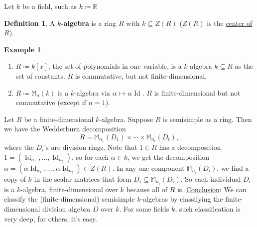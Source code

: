 \documentclass[12pt]{article}
\newcommand{\real}{\mathbb{R}}
\theoremstyle{definition}
\newtheorem{definition}[theorem]{Definition}
\newtheorem{example}{Example}[section]
\DeclareMathOperator\Id{Id}
\newcommand{\m}{\mathbb{M}}
\begin{document}
Let $k$ be a field, such as $k\coloneqq \real$
\begin{definition}
    A \textbf{$k$-algebra} is a ring $R$ with $k \subseteq Z(R)$ ($Z(R)$ is the \underline{center of $R$}). 
\end{definition}
\begin{example}
    \noindent
    \begin{enumerate}
        \item $R \coloneqq  k[x]$, the set of polynomials in one variable, is a $k$-algebra $k \subseteq R$ as the set of constants. $R$ is commutative, but not finite-dimensional.
        \item $R \coloneqq  \m_n(k)$ is a $k$-algebra via $\alpha \mapsto \alpha \Id$. $R$ is finite-dimensional but not commutative (except if $n = 1$).
    \end{enumerate}
\end{example}
Let $R$ be a finite-dimensional $k$-algebra. Suppose $R$ is semisimple as a ring. Then we have the Wedderburn decomposition
\begin{equation}
    R = \m_{n_1}(D_1) \times \dotsb \times \m_{n_t}(D_t),
\end{equation}
where the $D_i$'s are division rings. Note that $1 \in R$ has a decomposition $1 = (\Id_{n_1} , \dotsc , \Id_{n_t})$, so for each $\alpha \in k$, we get the decomposition
$\alpha = (\alpha \Id_{n_1} , \dotsc , \alpha \Id_{n_t}) \in Z(R)$. In any one component $\m_{n_i}(D_i)$, we find a copy of $k$ in the scalar matrices that form $D_i \subseteq \m_{n_i}(D_i)$. So each individual $D_i$ is a $k$-algebra, finite-dimensional over $k$ because all of $R$ is.
\newline
\newline 
\underline{Conclusion}: We can classify the (finite-dimensional) semisimple $k$-algebras by classifying the finite-dimensional division algebra $D$ over $k$. For some fields $k$, such classification is very deep, for others, it's easy.
\end{document}
